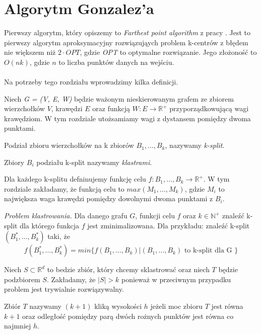 \section{Algorytm Gonzalez'a}

Pierwszy algorytm, który opiszemy to \textit{Farthest point algorithm} z pracy \cite{Gonzalez1985ClusteringTM}.
Jest to pierwszy algorytm aproksymacyjny rozwiązująych problem k-centrów z błędem nie większem niż $2 \cdot OPT$, gdzie \textit{OPT} to optymalne rozwiązanie.
Jego złożoność to $O(nk)$, gdzie $n$ to liczba punktów danych na wejściu. 
\\~\\
Na potrzeby tego rozdziału wprowadzimy kilka definicji.

\begin{definition}
    Niech \emph{G = (V, E, W)} będzie ważonym nieskierowanym grafem ze zbiorem wierzchołków $V$, krawędzi $E$ oraz funkcją $W: E \rightarrow \mathbb{R}^{+}$ przyporządkowującą wagi krawędziom. 
    W tym rozdziale utożsamiamy wagi z dystansem pomiędzy dwoma punktami. 
\end{definition}

\begin{definition}
    Podział zbioru wierzchołków na k zbiorów $B_{1},\dots,B_{k}$, nazywamy \emph{k-split}.
\end{definition}

\begin{definition}
    Zbiory $B_{i}$ podziału k-split nazywamy \emph{klastrami}.
\end{definition}

\noindent
Dla każdego k-splitu defninujemy funkcję celu $f: B_{1},\dots,B_{k} \rightarrow \mathbb{R}^{+}$.
W tym rozdziale zakładamy, że funkcją celu to $max(M_{1},\dots,M_{k})$, gdzie $M_{i}$ to największa waga krawędzi pomiędzy dowolnymi dwoma punktami z $B_{i}$.

\begin{definition}
    \emph{Problem klastrowania.} Dla danego grafu $G$, funkcji celu $f$ oraz $k \in \mathbb{N}^{+}$ znaleźć k-split dla którego funkcja $f$ jest zminimalizowana.
    Dla przykładu: znaleźć k-split $(B_{1}^{*},\dots,B_{k}^{*})$ taki, że 
    \begin{equation}
        f(B_{1}^{*},\dots,B_{k}^{*}) = min\{ f(B_{1},\dots,B_{k}) | (B_{1},\dots,B_{k}) \text{ to k-split dla G } \}
    \end{equation}
\end{definition}

\noindent
Niech $S \subset \mathbb{R}^{d}$ to bedzie zbiór, który chcemy sklastrować oraz niech $T$ będzie podzbiorem $S$.
Zakładamy, że $|S| > k$ ponieważ w przeciwnym przypadku problem jest trywialnie rozwiązywalny.
\begin{definition}
Zbiór $T$ nazywamy $(k+1)$ kliką wysokości $h$ jeżeli moc zbioru $T$ jest równa $k+1$ oraz odległość pomiędzy parą dwóch rożnych punktów jest równa co najmniej $h$. 
\end{definition}

